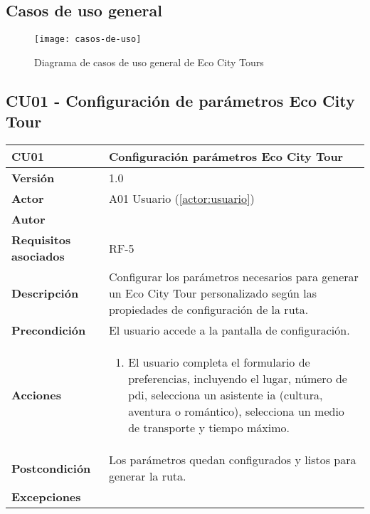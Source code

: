 \subsection{Casos de uso general}

\begin{figure}[H]
	\centering
	\hspace*{-2cm}
	\texttt{[image: casos-de-uso]}
	\caption{Diagrama de casos de uso general de Eco City Tours}
	\label{fig:casos-de-uso}
\end{figure}

\subsection{CU01 - Configuración de parámetros Eco City Tour}

\begin{table}[H]
	\centering
	\begin{tabularx}{\linewidth}{ p{} p{} }
		\toprule
		\textbf{CU01}    & \textbf{Configuración parámetros Eco City Tour} \\
		\toprule
		\textbf{Versión}              & 1.0    \\
		\textbf{Actor}                & A01 Usuario (\ref{actor:usuario}) \\
		\textbf{Autor}                & \autor \\
		\textbf{Requisitos asociados} & RF-5 \\
		\textbf{Descripción}          & Configurar los parámetros necesarios para generar un Eco City Tour personalizado según las propiedades de configuración de la ruta. \\
		\textbf{Precondición}         & El usuario accede a la pantalla de configuración. \\
		\textbf{Acciones}             &
		\begin{enumerate}
			\def\labelenumi{\arabic{enumi}.}
			\tightlist
			\item El usuario completa el formulario de preferencias, incluyendo el lugar, número de \acrshort{pdi}, selecciona un asistente \acrshort{ia} (cultura, aventura o romántico), selecciona un medio de transporte y tiempo máximo.
		\end{enumerate}\\
		\textbf{Postcondición}        & Los parámetros quedan configurados y listos para generar la ruta. \\
		\textbf{Excepciones}          & 
		\begin{itemize}

\end{itemize}
\end{tabularx}
\end{table}
